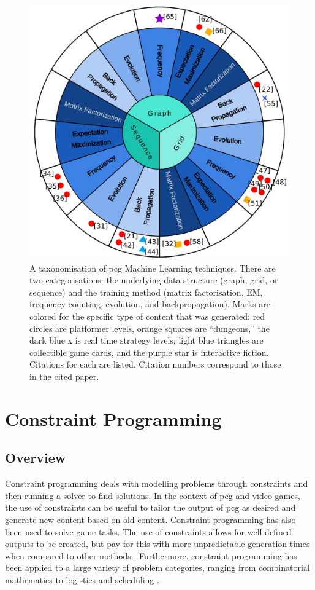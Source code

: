 \begin{figure}[H]
    \centering
    \includegraphics[width=\textwidth, height=0.5\textheight, keepaspectratio]{Images/PCGMLTaxonomy.jpg}
    \caption{A taxonomisation of \acrlong{pcg} Machine Learning techniques. There are two categorisations: the underlying data structure (graph, grid, or sequence) and the training method (matrix factorisation, EM, frequency counting, evolution, and backpropagation). Marks are colored for the specific type of content that was generated: red circles are platformer levels, orange squares are ``dungeons,'' the dark blue x is real time strategy levels, light blue triangles are collectible game cards, and the purple star is interactive fiction. Citations for each are listed. Citation numbers correspond to those in the cited paper. \cite{PCGML}}
    \label{fig:pcgml}
\end{figure}



\section{Constraint Programming}
\subsection{Overview}
Constraint programming deals with modelling problems through constraints and then running a solver to find solutions. In the context of \acrshort{pcg} and video games, the use of constraints can be useful to tailor the output of \acrshort{pcg} as desired and generate new content based on old content. Constraint programming has also been used to solve game tasks. The use of constraints allows for well-defined outputs to be created, but pay for this with more unpredictable generation times when compared to other methods \cite{WFC_In_The_Wild}. Furthermore, constraint programming has been applied to a large variety of problem categories, ranging from combinatorial mathematics to logistics and scheduling \cite{CSPLib}.

